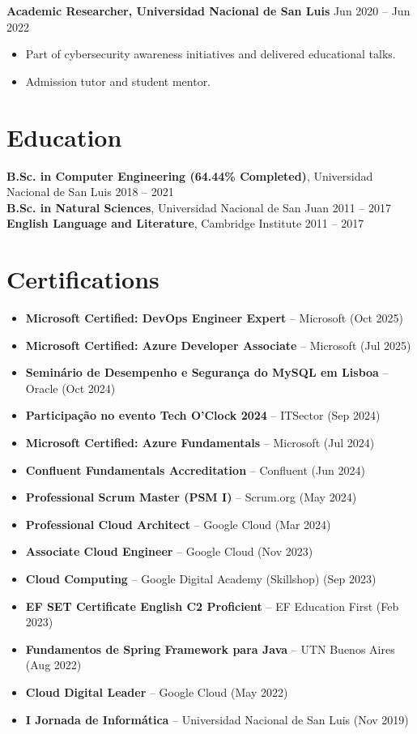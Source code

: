 \documentclass[10pt, letterpaper]{article}
\begin{document}
\textbf{Academic Researcher, Universidad Nacional de San Luis} \hfill Jun 2020 – Jun 2022 \
\begin{itemize}[leftmargin=10pt, noitemsep]
    \item Part of cybersecurity awareness initiatives and delivered educational talks.
    \item Admission tutor and student mentor.
\end{itemize}

\section{Education}
\textbf{B.Sc. in Computer Engineering (64.44\% Completed)}, Universidad Nacional de San Luis \hfill 2018 – 2021 \\
\textbf{B.Sc. in Natural Sciences}, Universidad Nacional de San Juan \hfill 2011 – 2017 \\
\textbf{English Language and Literature}, Cambridge Institute \hfill 2011 – 2017


\section{Certifications}
\begin{itemize}[leftmargin=10pt, noitemsep]
    \item \textbf{Microsoft Certified: DevOps Engineer Expert} – Microsoft (Oct 2025)
    \item \textbf{Microsoft Certified: Azure Developer Associate} – Microsoft (Jul 2025)
    \item \textbf{Seminário de Desempenho e Segurança do MySQL em Lisboa} – Oracle (Oct 2024)
    \item \textbf{Participação no evento Tech O'Clock 2024} – ITSector (Sep 2024)
    \item \textbf{Microsoft Certified: Azure Fundamentals} – Microsoft (Jul 2024)
    \item \textbf{Confluent Fundamentals Accreditation} – Confluent (Jun 2024)
    \item \textbf{Professional Scrum Master (PSM I)} – Scrum.org (May 2024)
    \item \textbf{Professional Cloud Architect} – Google Cloud (Mar 2024)
    \item \textbf{Associate Cloud Engineer} – Google Cloud (Nov 2023)
    \item \textbf{Cloud Computing} – Google Digital Academy (Skillshop) (Sep 2023)
    \item \textbf{EF SET Certificate English C2 Proficient} – EF Education First (Feb 2023)
    \item \textbf{Fundamentos de Spring Framework para Java} – UTN Buenos Aires (Aug 2022)
    \item \textbf{Cloud Digital Leader} – Google Cloud (May 2022)
    \item \textbf{I Jornada de Informática} – Universidad Nacional de San Luis (Nov 2019)
\end{itemize}
\end{document}
